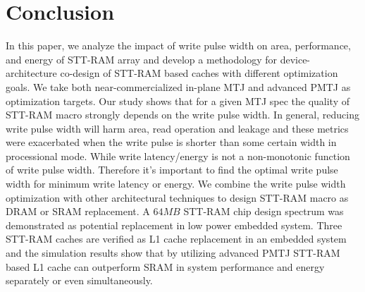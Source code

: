 \section{Conclusion} \label{sec:conclusion}

In this paper, we analyze the impact of write pulse width on area, performance, and energy of STT-RAM array and develop a methodology for device-architecture co-design of STT-RAM based caches with different optimization goals. We take both near-commercialized in-plane MTJ and advanced PMTJ as optimization targets. Our study shows that for a given MTJ spec the quality of STT-RAM macro strongly depends on the write pulse width. In general, reducing write pulse width will harm area, read operation and leakage and these metrics were exacerbated when the write pulse is shorter than some certain width in processional mode. While write latency/energy is not a non-monotonic function of write pulse width. Therefore it's important to find the optimal write pulse width for minimum write latency or energy. We combine the write pulse width optimization with other architectural techniques to design STT-RAM macro as DRAM or SRAM replacement. A $64MB$ STT-RAM chip design spectrum was demonstrated as potential replacement in low power embedded system. Three STT-RAM caches are verified as L1 cache replacement in an embedded system and the simulation results show that by utilizing advanced PMTJ STT-RAM based L1 cache can outperform SRAM in system performance and energy separately or even simultaneously. 